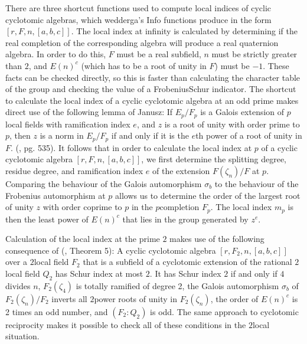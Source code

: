\documentclass[a4paper,11pt]{report}
\begin{document}
{{ There are three shortcut functions used to compute local indices of cyclic
cyclotomic algebras, which wedderga's \texttt{}Info functions
produce in the form $[r,F,n,[a,b,c]]$. The local index at infinity is calculated by determining if the real
completion of the corresponding algebra will produce a real quaternion
algebra. In order to do this, $F$ must be a real subfield, $n$ must be strictly greater than $2$, and $E(n)^c$ (which has to be a root of unity in $F$) must be $-1$. These facts can be checked directly, so this is faster than calculating the
character table of the group and checking the value of a
Frobenius\texttt{}Schur indicator. The shortcut to calculate the
local index of a cyclic cyclotomic algebra at an odd prime makes direct use of
the following lemma of Janusz: If $E_p/F_p$ is a Galois extension of $p$\texttt{}local fields with ramification index $e$, and $z$ is a root of unity with order prime to $p$, then $z$ is a norm in $E_p/F_p$ if and only if it is the $e$\texttt{}th power of a root of unity in $F$. (\cite{J}, pg. 535). It follows that in order to calculate the local index at $p$ of a cyclic cyclotomic algebra $[r,F,n,[a,b,c]]$, we first determine the splitting degree, residue degree, and ramification
index $e$ of the extension $F(\zeta_n)/F$ at $p$. Comparing the behaviour of the Galois automorphism $\sigma_b$ to the behaviour of the Frobenius automorphism at $p$ allows us to determine the order of the largest root of unity $z$ with order coprime to $p$ in the $p$\texttt{}completion $F_p$. The local index $m_p$ is then the least power of $E(n)^c$ that lies in the group generated by $z^e$. 

 Calculation of the local index at the prime $2$ makes use of the following consequence of (\cite{J}, Theorem 5): A cyclic cyclotomic algebra $[r,F_2,n,[a,b,c]]$ over a $2$\texttt{}local field $F_2$ that is a subfield of a cyclotomic extension of the rational $2$\texttt{}local field $Q_2$ has Schur index at most $2$. It has Schur index $2$ if and only if $4$ divides $n$, $F_2(\zeta_4)$ is totally ramified of degree 2, the Galois automorphism $\sigma_b$ of $F_2(\zeta_n)/F_2$ inverts all $2$\texttt{}power roots of unity in $F_2(\zeta_n)$, the order of $E(n)^c$ is 2 times an odd number, and $(F_2:Q_2)$ is odd. The same approach to cyclotomic reciprocity makes it possible to check
all of these conditions in the $2$\texttt{}local situation. 

}}
\end{document}
